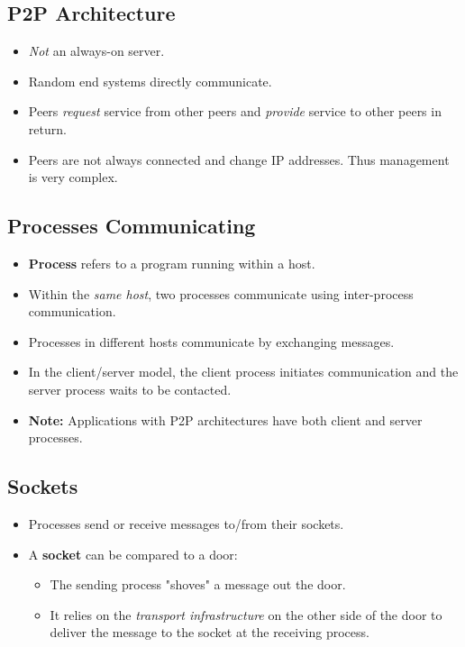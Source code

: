 \documentclass{article}
\begin{document}
\clearpage

\subsection{P2P Architecture}

\begin{itemize}
\item {\it Not} an always-on server.
\item Random end systems directly communicate.
\item Peers {\it request} service from other peers and {\it provide} service to other peers in return.
\item Peers are not always connected and change IP addresses. Thus management is very complex.
\end{itemize}

\subsection{Processes Communicating}

\begin{itemize}
\item {\bf Process} refers to a program running within a host.
\item Within the {\it same host}, two processes communicate using inter-process communication.
\item Processes in different hosts communicate by exchanging messages.
\item In the client/server model, the client process initiates communication and the server process waits to be contacted.
\item {\bf Note:} Applications with P2P architectures have both client and server processes.
\end{itemize}

\subsection{Sockets}

\begin{itemize}
\item Processes send or receive messages to/from their sockets.
\item A {\bf socket} can be compared to a door:
\begin{itemize}
\item The sending process "shoves" a message out the door.
\item It relies on the {\it transport infrastructure} on the other side of the door to deliver the message to the socket at the receiving process.
\end{itemize}
\end{itemize}
\end{document}
